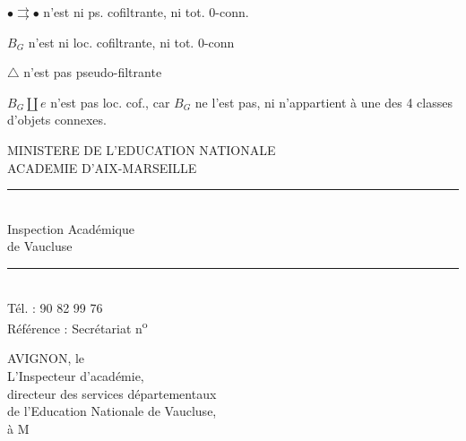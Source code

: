 $\bullet\rightrightarrows\bullet$ n'est ni ps. cofiltrante, ni tot. 0-conn.

$B_G$ n'est ni loc. cofiltrante, ni tot. 0-conn

$\triangle$  n'est pas pseudo-filtrante

$B_G\amalg e$ n'est pas loc. cof., car $B_G$ ne l'est pas, ni n'appartient à une des 4 classes d'objets connexes. 


MINISTERE DE L'EDUCATION NATIONALE\\
ACADEMIE D'AIX-MARSEILLE\\
\rule{2em}{.3pt}\\
Inspection Académique\\
de Vaucluse\\
\rule{2em}{.3pt}\\
Tél. : 90 82 99 76\\
Référence : Secrétariat n\textsuperscript{o}

AVIGNON, le\\[1ex]
L'Inspecteur d'académie,\\
directeur des services départementaux\\
de l'Education Nationale de Vaucluse,\\[1ex]
à M



